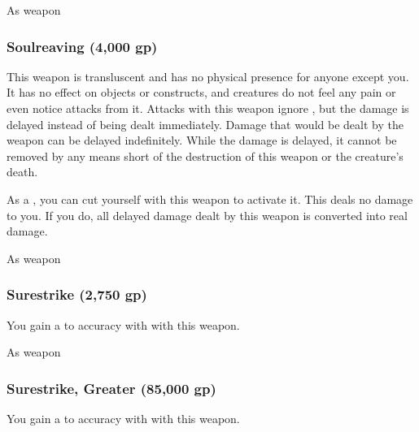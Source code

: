  


 As weapon


\lowercase{\hypertarget{item:Soulreaving}{}}\label{item:Soulreaving}
\hypertarget{item:Soulreaving}{\subsubsection{Soulreaving\hfill{} (4,000 gp)}}

This weapon is transluscent and has no physical presence for anyone except you.
It has no effect on objects or constructs, and creatures do not feel any pain or even notice attacks from it.
Attacks with this weapon ignore , but the damage is delayed instead of being dealt immediately.
Damage that would be dealt by the weapon can be delayed indefinitely.
While the damage is delayed, it cannot be removed by any means short of the destruction of this weapon or the creature's death.

As a , you can cut yourself with this weapon to activate it.
This deals no damage to you.
If you do, all delayed damage dealt by this weapon is converted into real damage.



 As weapon


\lowercase{\hypertarget{item:Surestrike}{}}\label{item:Surestrike}
\hypertarget{item:Surestrike}{\subsubsection{Surestrike\hfill{} (2,750 gp)}}

You gain a   to accuracy with  with this weapon.



 


 As weapon


\lowercase{\hypertarget{item:Surestrike, Greater}{}}\label{item:Surestrike, Greater}
\hypertarget{item:Surestrike, Greater}{\subsubsection{Surestrike, Greater\hfill{} (85,000 gp)}}

You gain a   to accuracy with  with this weapon.



